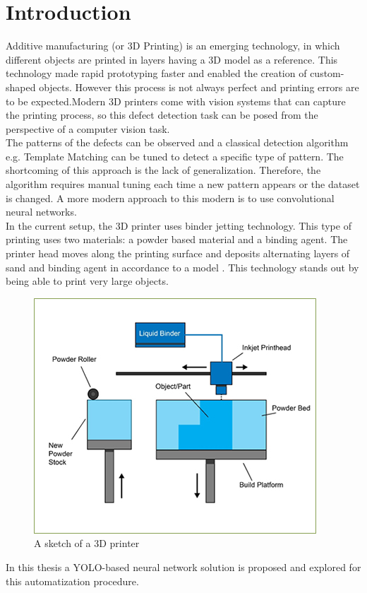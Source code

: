 \section{Introduction}

Additive manufacturing (or 3D Printing) is an emerging technology, in which different objects are printed in layers having a 3D model as a reference. This technology made rapid prototyping faster and enabled the creation of custom-shaped objects. However this process is not always perfect and printing errors are to be expected.Modern 3D printers come with vision systems that can capture the printing process, so this defect detection task can be posed from the perspective of a computer vision task. \\
The patterns of the defects can be observed and a classical detection algorithm e.g. Template Matching can be tuned to detect a specific type of pattern. The shortcoming of this approach is the lack of generalization. Therefore, the algorithm requires manual tuning each time a new pattern appears or the dataset is changed. A more modern approach to this modern is to use convolutional neural networks. \\
In the current setup, the 3D printer uses binder jetting technology. This type of printing uses two materials: a powder based material and a binding agent. The printer head moves along the printing surface and deposits alternating layers of sand and binding agent in accordance to a model \cite{binder_jetting}. This technology stands out by being able to print very large objects. \\
\begin{figure}[!h]
  \centering
  \captionsetup{justification=centering,margin=2cm}
  \includegraphics[width=0.5\linewidth]{images/introduction/binderjetting}
  \caption{A sketch of a 3D printer}
  \label{intro:printer}
\end{figure}
In this thesis a YOLO-based neural network solution is proposed and explored for this automatization procedure.  \\

